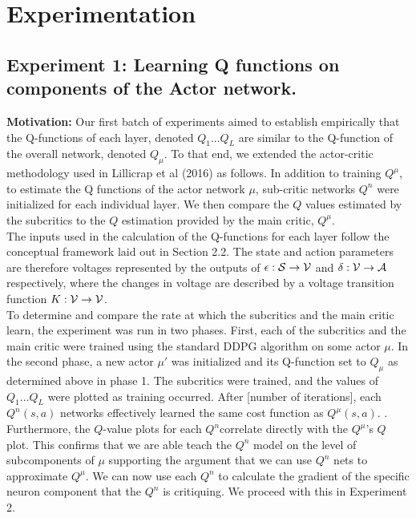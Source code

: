 \section{Experimentation}
\subsection{Experiment 1: Learning Q functions on components of the Actor network.}

\textbf{Motivation:}
Our first batch of experiments aimed to establish empirically that the Q-functions of each layer, denoted $Q_1...Q_L$ are similar to the Q-function of the overall network, denoted $Q_{\mu}$. To that end, we extended the actor-critic methodology used in Lillicrap et al (2016) as follows. In addition to training $Q^\mu$, to estimate the Q functions of the actor network $\mu$, sub-critic networks $Q^n$ were initialized for each individual layer. We then compare the $Q$ values estimated by the subcritics to the $Q$ estimation provided by the main critic, $Q^\mu$. \\
\newline
The inputs used in the calculation of the Q-functions for each layer follow the conceptual framework laid out in Section 2.2. The state and action parameters are therefore voltages represented by the outputs of $\epsilon : {\mathcal S} \to {\mathcal V}$ and $\delta : {\mathcal V} \to {\mathcal A}$ respectively, where the changes in voltage are described by a voltage transition function $K : {\mathcal V} \to {\mathcal V}$. \\
\newline
To determine and compare the rate at which the subcritics and the main critic learn, the experiment was run in two phases. First, each of the subcritics and the main critic were trained using the standard DDPG algorithm on some actor $\mu$. In the second phase, a new actor $\mu'$ was initialized and its Q-function set to $Q_{\mu}$ as determined above in phase 1. The subcritics were trained, and the values of $Q_1\dots Q_{L}$ were plotted as training occurred. 
\newline
After [number of iterations], each $Q^n(s,a)$  networks effectively learned the same cost function as $Q^{\mu}(s,a)$.
. Furthermore, the $Q$-value plots for each $Q^n$correlate directly with the  $Q^{\mu}$'s $Q$ plot. This confirms that we are able teach the $Q^n$ model on the level of subcomponents of $\mu$ supporting the argument that we can use $Q^n$ nets to approximate $Q^\mu$. We can now use each $Q^n$ to calculate the gradient of the specific neuron component that the $Q^n$ is critiquing. We proceed with this in Experiment 2.

